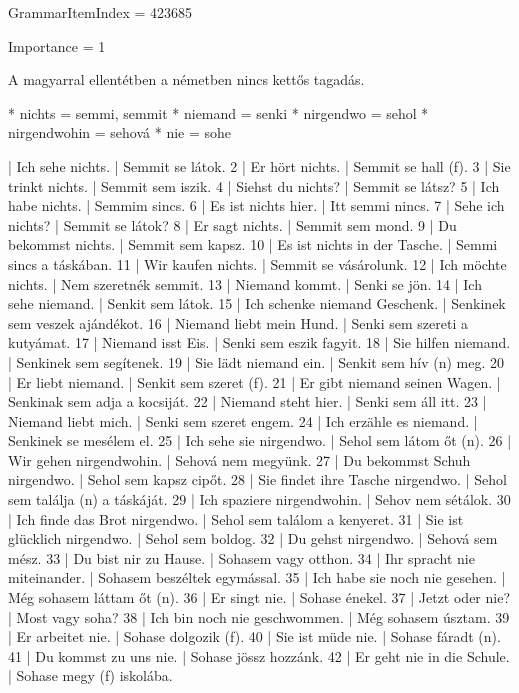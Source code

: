 \documentclass{article}
\newenvironment{desc}{\verbatim}{\endverbatim}
\newenvironment{exmp}{\verbatim}{\endverbatim}
\begin{document}
GrammarItemIndex = 423685

Importance = 1

\begin{desc}
A magyarral ellentétben a németben nincs kettős tagadás.

* nichts = semmi, semmit
* niemand = senki
* nirgendwo = sehol
* nirgendwohin = sehová
* nie = sohe
\end{desc}

\begin{exmp}
1 | Ich sehe nichts. | Semmit se látok.
2 | Er hört nichts. | Semmit se hall (f).
3 | Sie trinkt nichts. | Semmit sem iszik.
4 | Siehst du nichts? | Semmit se látsz?
5 | Ich habe nichts. | Semmim sincs.
6 | Es ist nichts hier. | Itt semmi nincs.
7 | Sehe ich nichts? | Semmit se látok?
8 | Er sagt nichts. | Semmit sem mond.
9 | Du bekommst nichts. | Semmit sem kapsz.
10 | Es ist nichts in der Tasche. | Semmi sincs a táskában.
11 | Wir kaufen nichts. | Semmit se vásárolunk.
12 | Ich möchte nichts. | Nem szeretnék semmit.
13 | Niemand kommt. | Senki se jön.
14 | Ich sehe niemand. | Senkit sem látok.
15 | Ich schenke niemand Geschenk. | Senkinek sem veszek ajándékot.
16 | Niemand liebt mein Hund. | Senki sem szereti a kutyámat.
17 | Niemand isst Eis. | Senki sem eszik fagyit.
18 | Sie hilfen niemand. | Senkinek sem segítenek.
19 | Sie lädt niemand ein. | Senkit sem hív (n) meg.
20 | Er liebt niemand. | Senkit sem szeret (f).
21 | Er gibt niemand seinen Wagen. | Senkinak sem adja a kocsiját.
22 | Niemand steht hier. | Senki sem áll itt.
23 | Niemand liebt mich. | Senki sem szeret engem.
24 | Ich erzähle es niemand. | Senkinek se mesélem el.
25 | Ich sehe sie nirgendwo. | Sehol sem látom őt (n).
26 | Wir gehen nirgendwohin. | Sehová nem megyünk.
27 | Du bekommst Schuh nirgendwo. | Sehol sem kapsz cipőt.
28 | Sie findet ihre Tasche nirgendwo. | Sehol sem találja (n) a táskáját.
29 | Ich spaziere nirgendwohin. | Sehov nem sétálok.
30 | Ich finde das Brot nirgendwo. | Sehol sem találom a kenyeret.
31 | Sie ist glücklich nirgendwo. | Sehol sem boldog.
32 | Du gehst nirgendwo. | Sehová sem mész.
33 | Du bist nir zu Hause. | Sohasem vagy otthon.
34 | Ihr spracht nie miteinander. | Sohasem beszéltek egymással.
35 | Ich habe sie noch nie gesehen. | Még sohasem láttam őt (n).
36 | Er singt nie. | Sohase énekel.
37 | Jetzt oder nie? | Most vagy soha?
38 | Ich bin noch nie geschwommen. | Még sohasem úsztam.
39 | Er arbeitet nie. | Sohase dolgozik (f).
40 | Sie ist müde nie. | Sohase fáradt (n).
41 | Du kommst zu uns nie. | Sohase jössz hozzánk.
42 | Er geht nie in die Schule. | Sohase megy (f) iskolába.
\end{exmp}
\end{document}
